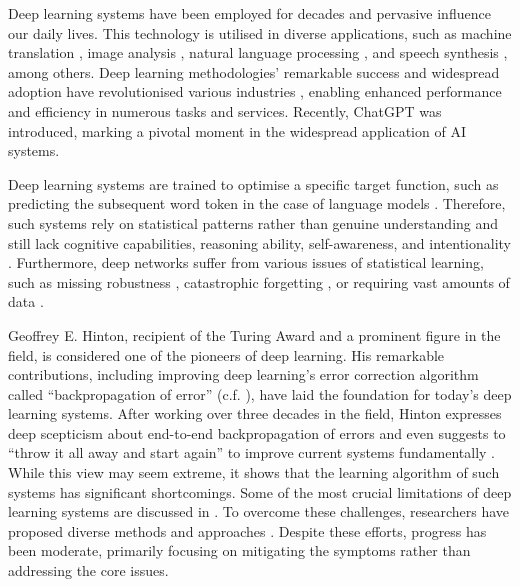 Deep learning systems have been employed for decades \cite{ivakhnenko_cybernetic_1965} and pervasive influence our daily lives. This technology is utilised in diverse applications, such as machine translation \cite{dabre_survey_2021}, image analysis \cite{bhatt_cnn_2021}, natural language processing \cite{otter_survey_2021}, and speech synthesis \cite{ning_review_2019}, among others. Deep learning methodologies' remarkable success and widespread adoption have revolutionised various industries , enabling enhanced performance and efficiency in numerous tasks and services.
Recently, ChatGPT  was introduced, marking a pivotal moment in the widespread application of AI systems.

Deep learning systems are trained to optimise a specific target function, such as predicting the subsequent word token in the case of language models .
Therefore, such systems rely on statistical patterns rather than genuine understanding and still lack cognitive capabilities, reasoning ability, self-awareness, and intentionality .
Furthermore, deep networks suffer from various issues of statistical learning, such as missing robustness , catastrophic forgetting , or requiring vast amounts of data .

Geoffrey E. Hinton, recipient of the Turing Award and a prominent figure in the field, is considered one of the pioneers of deep learning.
His remarkable contributions, including improving deep learning's error correction algorithm called ``backpropagation of error''   (c.f. ), have laid the foundation for today's deep learning systems.
After working over three decades in the field, Hinton expresses deep scepticism about end-to-end backpropagation of errors and even suggests to ``throw it all away and start again'' to improve current systems fundamentally .
While this view may seem extreme, it shows that the learning algorithm of such systems has significant shortcomings.
Some of the most crucial limitations of deep learning systems are discussed in .
To overcome these challenges, researchers have proposed diverse methods and approaches \cite{long_survey_2022, sager_unsupervised_2022, yarats_improving_2021}. Despite these efforts, progress has been moderate, primarily focusing on mitigating the symptoms rather than addressing the core issues.

